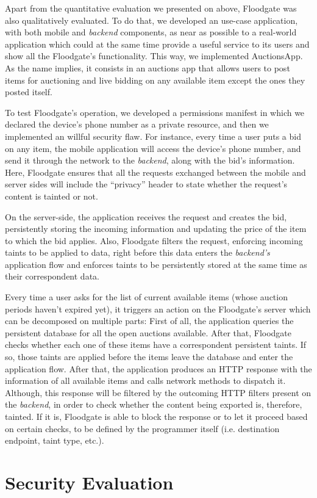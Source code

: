 Apart from the quantitative evaluation we presented on above, Floodgate was also qualitatively evaluated. To do that, we developed an use-case application, with both mobile and \textit{backend} components, as near as possible to a real-world application which could at the same time provide a useful service to its users and show all the Floodgate's functionality. This way, we implemented AuctionsApp. As the name implies, it consists in an auctions app that allows users to post items for auctioning and live bidding on any available item except the ones they posted itself. 

To test Floodgate's operation, we developed a permissions manifest in which we declared the device's phone number as a private resource, and then we implemented an willful security flaw. For instance, every time a user puts a bid on any item, the mobile application will access the device's phone number, and send it through the network to the \textit{backend}, along with the bid's information. Here, Floodgate ensures that all the requests exchanged between the mobile and server sides will include the ``privacy'' header to state whether the request's content is tainted or not. 

On the server-side, the application receives the request and creates the bid, persistently storing the incoming information and updating the price of the item to which the bid applies. Also, Floodgate  filters the request, enforcing incoming taints to be applied to data, right before this data enters the \textit{backend's} application flow and enforces taints to be persistently stored at the same time as their correspondent data.

Every time a user asks for the list of current available items (whose auction periods haven't expired yet), it triggers an action on the Floodgate's server which can be decomposed on multiple parts: First of all, the application queries the persistent database for all the open auctions available. After that, Floodgate checks whether each one of these items have a correspondent persistent taints. If so, those taints are applied before the items leave the database and enter the application flow. After that, the application produces an HTTP response with the information of all available items and calls network methods to dispatch it. Although, this response will be filtered by the outcoming HTTP filters present on the \textit{backend}, in order to check whether the content being exported is, therefore, tainted. If it is, Floodgate is able to block the response or to let it proceed based on certain checks, to be defined by the programmer itself (i.e. destination endpoint, taint type, etc.).

\section{Security Evaluation}



    
 
